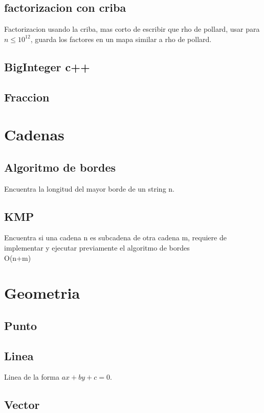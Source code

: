 \documentclass[10pt,landscape,twocolumn,a4paper,notitlepage]{article}
\newcommand\cppfile[2][]{

}
\begin{document}
			\subsection{factorizacion con criba}
			Factorizacion usando la criba, mas corto de escribir que rho de pollard, usar
			para $n \leq 10^{12}$, guarda los factores en un mapa similar a rho de pollard.
			\cppfile[10-54]{matematicas/factorizacion_criba.cpp}
			\subsection{BigInteger c++}
			\cppfile[4-197]{matematicas/biginteger.cpp}
			\subsection{Fraccion}
			\cppfile[9-47]{matematicas/fraccion.cpp}
			
		\section{Cadenas}
			\subsection{Algoritmo de bordes}
			Encuentra la longitud del mayor borde de un string n.
			\cppfile[4-16]{cadenas/bordes.cpp}
			\subsection{KMP}
			Encuentra si una cadena n es subcadena de otra cadena m, requiere de implementar
			y ejecutar previamente el algoritmo de bordes\\
			O(n+m)
			\cppfile[18-29]{cadenas/kmp.cpp}
			
		\section{Geometria}
			\subsection{Punto}
			\cppfile[19-53]{geometria/punto.cpp}
			\subsection{Linea}
			Linea de la forma $ax + by + c = 0$.
			\cppfile[42-94]{geometria/linea.cpp}
			\subsection{Vector}
			\cppfile[39-67]{geometria/vector.cpp}
	
\end{document}
